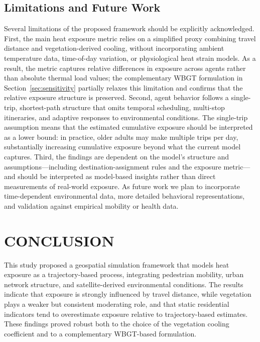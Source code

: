 \documentclass{wscpaperproc}
\theoremstyle{wsc}
\begin{document}
\subsection{Limitations and Future Work}

Several limitations of the proposed framework should be explicitly acknowledged. First, the main heat exposure metric relies on a simplified proxy combining travel distance and vegetation-derived cooling, without incorporating ambient temperature data, time-of-day variation, or physiological heat strain models. As a result, the metric captures relative differences in exposure across agents rather than absolute thermal load values; the complementary WBGT formulation in Section~\ref{sec:sensitivity} partially relaxes this limitation and confirms that the relative exposure structure is preserved. Second, agent behavior follows a single-trip, shortest-path structure that omits temporal scheduling, multi-stop itineraries, and adaptive responses to environmental conditions. The single-trip assumption means that the estimated cumulative exposure should be interpreted as a lower bound: in practice, older adults may make multiple trips per day, substantially increasing cumulative exposure beyond what the current model captures.
Third, the findings are dependent on the model's structure and assumptions—including destination-assignment rules and the exposure metric—and should be interpreted as model-based insights rather than direct measurements of real-world exposure. As future work we plan to incorporate time-dependent environmental data, more detailed behavioral representations, and validation against empirical mobility or health data.

\section{CONCLUSION}

This study proposed a geospatial simulation framework that models heat exposure as a trajectory-based process, integrating pedestrian mobility, urban network structure, and satellite-derived environmental conditions. The results indicate that exposure is strongly influenced by travel distance, while vegetation plays a weaker but consistent moderating role, and that static residential indicators tend to overestimate exposure relative to trajectory-based estimates. These findings proved robust both to the choice of the vegetation cooling coefficient and to a complementary WBGT-based formulation.
\end{document}
